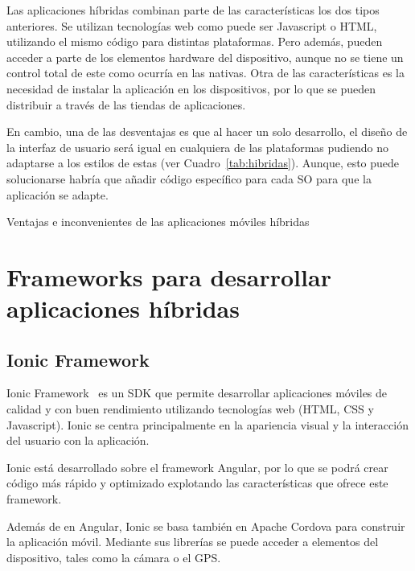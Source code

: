 Las aplicaciones híbridas combinan parte de las características los dos tipos anteriores. Se utilizan tecnologías web 
como puede ser Javascript o HTML, utilizando el mismo código para distintas plataformas. Pero además, pueden 
acceder a parte de los elementos hardware del dispositivo, aunque no se tiene un control total de este como 
ocurría en las nativas. Otra de las características es la necesidad de instalar la aplicación en los dispositivos, por 
lo que se pueden distribuir a través de las tiendas de aplicaciones.

En cambio, una de las desventajas es que al hacer un solo desarrollo, el diseño de la interfaz de usuario será igual
en cualquiera de las plataformas pudiendo no adaptarse a los estilos de estas (ver Cuadro~\ref{tab:hibridas}). Aunque, esto puede solucionarse
habría que añadir código específico para cada \acs{SO} para que la aplicación se adapte.

\begin{table}[hibridas]
	\centering
	{\small
		
	}
	\caption[Ventajas e inconvenientes de las aplicaciones móviles híbridas]
	{Ventajas e inconvenientes de las aplicaciones móviles híbridas~\cite{TIPAPP}}
	\label{tab:hibridas}
\end{table}

\section{Frameworks para desarrollar aplicaciones híbridas}

\subsection{Ionic Framework}

Ionic Framework~\cite{IONIC} es un SDK que permite desarrollar aplicaciones móviles de calidad y con buen 
rendimiento utilizando tecnologías web (HTML, CSS y Javascript). Ionic se centra principalmente en la apariencia 
visual y la interacción del usuario con la aplicación. 

Ionic está desarrollado sobre el framework Angular, por lo que se podrá crear código más rápido y optimizado 
explotando las características que ofrece este framework.

Además de en Angular, Ionic se basa también en Apache Cordova para construir la aplicación móvil. Mediante sus 
librerías se puede acceder a elementos del dispositivo, tales como la cámara o el \acs{GPS}.

